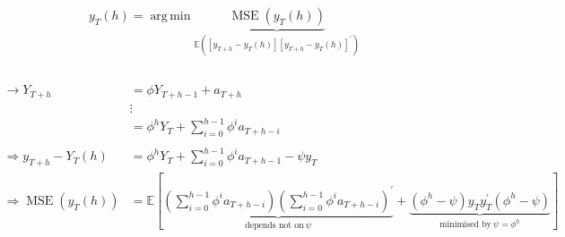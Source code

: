 \documentclass[12pt,a4paper]{article}
\DeclareMathOperator*{\argmin}{arg\,min}
\newcommand{\MSE}{\operatorname{MSE}} %
\begin{document}
\begin{align*}
  y_T (h) = \argmin \underbrace{\MSE(y_T (h))}_{\mathbb{E} \left( \left[y_{T+h} - y_T (h) \right] \left[y_{T+h} - y_T (h) \right]^{'} \right)}\\
\end{align*}\\
\begin{align*}  
  \rightarrow Y_{T+h} & = \phi Y_{T+ h -1} + a_{T+h}\\
  & \vdots\\
  & = \phi^h  Y_T + \sum_{i = 0}^{h -1} \phi^i a_{T+h-i}\\
  \\
  \Rightarrow y_{T+ h} - Y_T (h) & = \phi^h Y_T + \sum_{i = 0}^{h -1} \phi^i a_{T + h -1} - \psi y_T\\
  \Rightarrow \MSE(y_T (h)) & = \mathbb{E} \left[ \underbrace{\left( \sum_{i = 0}^{h-1} \phi^i a_{T+h-i}  \right) \left( \sum_{i = 0}^{h-1} \phi^i a_{T+h-i}  \right)^{'} }_{\text{depends not on} \ \psi}       + \underbrace{\left(\phi^h - \psi \right)y_T y_T^{'} \left(\phi^h - \psi \right)}_{\text{minimised by} \ \psi = \phi^h} \right]
\end{align*}
\end{document}
